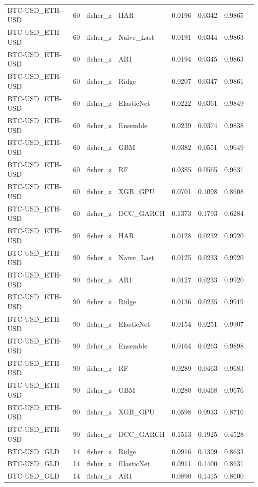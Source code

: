\begin{table}[H]
\begin{tabular}{llllrrrr}
BTC-USD_ETH-USD & 60 & fisher_z & HAR & 0.0196 & 0.0342 & 0.9865 &  \\
BTC-USD_ETH-USD & 60 & fisher_z & Naive_Last & 0.0191 & 0.0344 & 0.9863 &  \\
BTC-USD_ETH-USD & 60 & fisher_z & AR1 & 0.0194 & 0.0345 & 0.9863 &  \\
BTC-USD_ETH-USD & 60 & fisher_z & Ridge & 0.0207 & 0.0347 & 0.9861 &  \\
BTC-USD_ETH-USD & 60 & fisher_z & ElasticNet & 0.0222 & 0.0361 & 0.9849 &  \\
BTC-USD_ETH-USD & 60 & fisher_z & Ensemble & 0.0239 & 0.0374 & 0.9838 &  \\
BTC-USD_ETH-USD & 60 & fisher_z & GBM & 0.0382 & 0.0551 & 0.9649 &  \\
BTC-USD_ETH-USD & 60 & fisher_z & RF & 0.0385 & 0.0565 & 0.9631 &  \\
BTC-USD_ETH-USD & 60 & fisher_z & XGB_GPU & 0.0701 & 0.1098 & 0.8608 &  \\
BTC-USD_ETH-USD & 60 & fisher_z & DCC_GARCH & 0.1373 & 0.1793 & 0.6284 &  \\
BTC-USD_ETH-USD & 90 & fisher_z & HAR & 0.0128 & 0.0232 & 0.9920 &  \\
BTC-USD_ETH-USD & 90 & fisher_z & Naive_Last & 0.0125 & 0.0233 & 0.9920 &  \\
BTC-USD_ETH-USD & 90 & fisher_z & AR1 & 0.0127 & 0.0233 & 0.9920 &  \\
BTC-USD_ETH-USD & 90 & fisher_z & Ridge & 0.0136 & 0.0235 & 0.9919 &  \\
BTC-USD_ETH-USD & 90 & fisher_z & ElasticNet & 0.0154 & 0.0251 & 0.9907 &  \\
BTC-USD_ETH-USD & 90 & fisher_z & Ensemble & 0.0164 & 0.0263 & 0.9898 &  \\
BTC-USD_ETH-USD & 90 & fisher_z & RF & 0.0289 & 0.0463 & 0.9683 &  \\
BTC-USD_ETH-USD & 90 & fisher_z & GBM & 0.0280 & 0.0468 & 0.9676 &  \\
BTC-USD_ETH-USD & 90 & fisher_z & XGB_GPU & 0.0598 & 0.0933 & 0.8716 &  \\
BTC-USD_ETH-USD & 90 & fisher_z & DCC_GARCH & 0.1513 & 0.1925 & 0.4528 &  \\
BTC-USD_GLD & 14 & fisher_z & Ridge & 0.0916 & 0.1399 & 0.8633 &  \\
BTC-USD_GLD & 14 & fisher_z & ElasticNet & 0.0911 & 0.1400 & 0.8631 &  \\
BTC-USD_GLD & 14 & fisher_z & AR1 & 0.0890 & 0.1415 & 0.8600 &  \\

\end{tabular}
\end{table}
